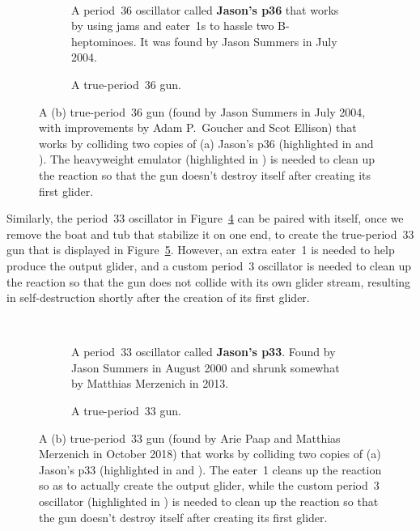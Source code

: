 \begin{figure}[!htb]
	\centering
	${}$ \ \begin{subfigure}{0.53\textwidth}
		\centering\vspace*{0.6cm}
		\caption{A period~$36$ oscillator called \textbf{Jason's p36} that works by using jams and eater~1s to hassle two B-heptominoes. It was found by Jason Summers in July 2004.}\label{fig:jasons_p36}
	\end{subfigure} \hfill \begin{subfigure}{0.42\textwidth}
		\centering
		\caption{A true-period~$36$ gun.}\label{fig:p36_gun}
	\end{subfigure}
	\caption{A (b) true-period~$36$ gun (found by Jason Summers in July 2004, with improvements by Adam P.~Goucher and Scot Ellison) that works by colliding two copies of (a) Jason's p$36$ (highlighted in  and ). The heavyweight emulator (highlighted in ) is needed to clean up the reaction so that the gun doesn't destroy itself after creating its first glider.}\label{fig:p36_gun_both}
\end{figure}

Similarly, the period~$33$ oscillator in Figure~\ref{fig:jasons_p33} can be paired with itself, once we remove the boat and tub that stabilize it on one end, to create the true-period~$33$ gun that is displayed in Figure~\ref{fig:p33_gun}. However, an extra eater~1 is needed to help produce the output glider, and a custom period~$3$ oscillator is needed to clean up the reaction so that the gun does not collide with its own glider stream, resulting in self-destruction shortly after the creation of its first glider.

\begin{figure}[!htb]
	\centering
	${}$ \ \begin{subfigure}{0.46\textwidth}
		\centering
		\caption{A period~$33$ oscillator called \textbf{Jason's p33}. Found by Jason Summers in August 2000 and shrunk somewhat by Matthias Merzenich in 2013.}\label{fig:jasons_p33}
	\end{subfigure} \hfill \begin{subfigure}{0.49\textwidth}
		\centering
		\caption{A true-period~$33$ gun.}\label{fig:p33_gun}
	\end{subfigure}
	\caption{A (b) true-period~$33$ gun (found by Arie Paap and Matthias Merzenich in October 2018) that works by colliding two copies of (a) Jason's p$33$ (highlighted in  and ). The eater~1 cleans up the reaction so as to actually create the output glider, while the custom period~$3$ oscillator (highlighted in ) is needed to clean up the reaction so that the gun doesn't destroy itself after creating its first glider.}\label{fig:p33_gun_both}
\end{figure}


